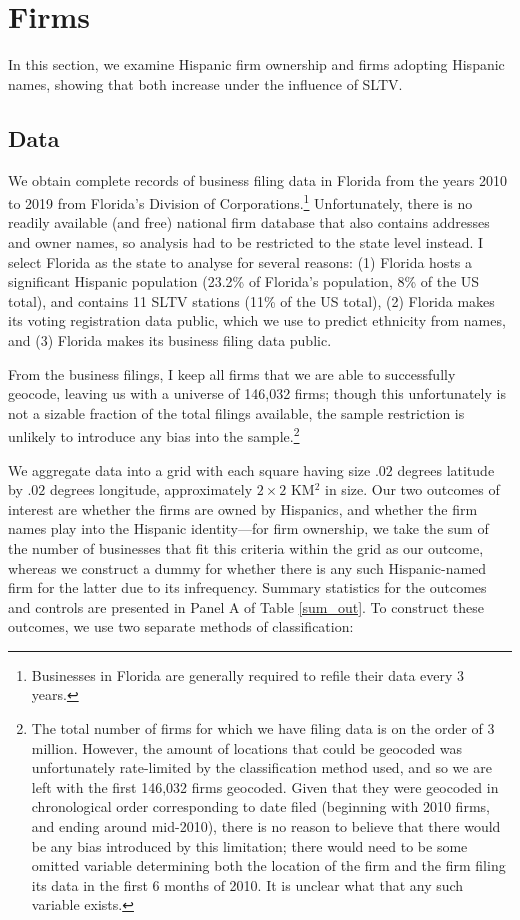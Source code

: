 \documentclass[11pt]{article}
\begin{document}

\section{Firms}\label{secfirm}

In this section, we examine Hispanic firm ownership and firms adopting Hispanic names, showing that both increase under the influence of SLTV. 

\subsection{Data}

We obtain complete records of business filing data in Florida from the years 2010 to 2019 from Florida's Division of Corporations.\footnote{ Businesses in Florida are generally required to refile their data every 3 years.} Unfortunately, there is no readily available (and free) national firm database that also contains addresses and owner names, so analysis had to be restricted to the state level instead. I select Florida as the state to analyse for several reasons: (1) Florida hosts a significant Hispanic population (23.2\% of Florida's population, 8\% of the US total), and contains 11 SLTV stations (11\% of the US total), (2) Florida makes its voting registration data public, which we use to predict ethnicity from names, and (3) Florida makes its business filing data public. 

From the business filings, I keep all firms that we are able to successfully geocode, leaving us with a universe of 146,032 firms; though this unfortunately is not a sizable fraction of the total filings available, the sample restriction is unlikely to introduce any bias into the sample.\footnote{ The total number of firms for which we have filing data is on the order of 3 million. However, the amount of locations that could be geocoded was unfortunately rate-limited by the classification method used, and so we are left with the first 146,032 firms geocoded. Given that they were geocoded in chronological order corresponding to date filed (beginning with 2010 firms, and ending around mid-2010), there is no reason to believe that there would be any bias introduced by this limitation; there would need to be some omitted variable determining both the location of the firm and the firm filing its data in the first 6 months of 2010. It is unclear what that any such variable exists.} 

We aggregate data into a grid with each square having size $.02$ degrees latitude by $.02$ degrees longitude, approximately $2 \times 2$ KM$^2$ in size. Our two outcomes of interest are whether the firms are owned by Hispanics, and whether the firm names play into the Hispanic identity---for firm ownership, we take the sum of the number of businesses that fit this criteria within the grid as our outcome, whereas we construct a dummy for whether there is any such Hispanic-named firm for the latter due to its infrequency. Summary statistics for the outcomes and controls are presented in Panel A of Table \ref{sum_out}. To construct these outcomes, we use two separate methods of classification:
\end{document}
